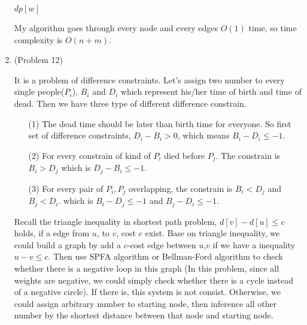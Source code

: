 \normalfont\documentclass[letterpaper,11pt]{article}
\begin{document}
\begin{enumerate}
\begin{algorithm*}
\begin{algorithmic}
			\EndIf
		\EndFor
	\EndWhile 
	\State \Return $dp[w]$
\end{algorithmic}
\end{algorithm*}\par
My algorithm goes through every node and every edges $O(1)$ time, so time complexity is $O(n + m)$.
\item (Problem 12)\par
It is a problem of difference constraints. Let's assign two number to every single people($P_i$), $B_i$ and $D_i$ which represent his/her time of birth and time of dead. Then we have three type of different difference constrain.
\begin{enumerate}
	\item[(1)]
	The dead time should be later than birth time for everyone. So first set of difference constraints, $D_i - B_i > 0$, which means $B_i - D_i \leq -1$.
	\item[(2)]
	For every constrain of kind of $P_i$ died before $P_j$. The constrain is $B_i > D_j$ which is $D_j - B_i \leq -1$.
	\item[(3)]
	For every pair of $P_i,P_j$ overlapping, the constrain is $B_i < D_j$ and $B_j < D_i$. which is $B_i - D_j \leq -1$ and $B_j - D_i \leq -1$.
\end{enumerate}
Recall the triangle inequality in shortest path problem, $d[v] - d[u] \leq c$ holds, if a edge from $u$, to $v$, cost $c$ exist. Base on triangle inequality, we could build a graph by add a $c$-cost edge between $u$,$v$ if we have a inequality $u - v \leq c$. Then use SPFA algorithm or Bellman-Ford algorithm to check whether there is a negative loop in this graph (In this problem, since all weights are negative, we could simply check whether there is a cycle instead of a negative circle). If there is, this system is not consist. Otherwise, we could assign arbitrary number to starting node, then inference all other number by the shortest distance between that node and starting node.
\end{enumerate}
\end{document}
